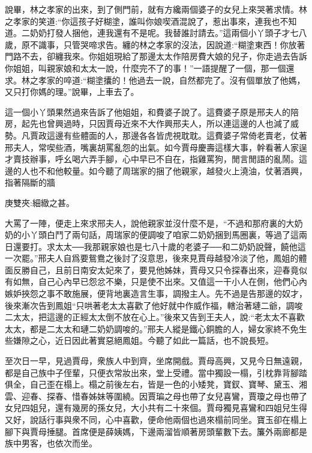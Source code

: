 \begin{parag}
    說畢，林之孝家的出來，到了側門前，就有方纔兩個婆子的女兒上來哭著求情。林之孝家的笑道:“你這孩子好糊塗，誰叫你娘喫酒混說了，惹出事來，連我也不知道。二奶奶打發人捆他，連我還有不是呢。我替誰討請去。”這兩個小丫頭子才七八歲，原不識事，只管哭啼求告。纏的林之孝家的沒法，因說道:“糊塗東西！你放著門路不去，卻纏我來。你姐姐現給了那邊太太作陪房費大娘的兒子，你走過去告訴你姐姐，叫親家娘和太太一說，什麼完不了的事！”一語提醒了一個，那一個還求。林之孝家的啐道:“糊塗攮的！他過去一說，自然都完了。沒有個單放了他媽，又只打你媽的理。”說畢，上車去了。
\end{parag}


\begin{parag}
    這一個小丫頭果然過來告訴了他姐姐，和費婆子說了。這費婆子原是邢夫人的陪房，起先也曾興過時，只因賈母近來不大作興邢夫人，所以連這邊的人也減了威勢。凡賈政這邊有些體面的人，那邊各各皆虎視耽耽。這費婆子常倚老賣老，仗著邢夫人，常喫些酒，嘴裏胡罵亂怨的出氣。如今賈母慶壽這樣大事，幹看著人家逞才賣技辦事，呼幺喝六弄手腳，心中早已不自在，指雞罵狗，閒言閒語的亂鬧。這邊的人也不和他較量。如今聽了周瑞家的捆了他親家，越發火上澆油，仗著酒興，指著隔斷的牆\begin{note}庚雙夾:細緻之甚。\end{note}大罵了一陣，便走上來求邢夫人，說他親家並沒什麼不是，“不過和那府裏的大奶奶的小丫頭白鬥了兩句話，周瑞家的便調唆了咱家二奶奶捆到馬圈裏，等過了這兩日還要打。求太太──我那親家娘也是七八十歲的老婆子──和二奶奶說聲，饒他這一次罷。”邢夫人自爲要鴛鴦之後討了沒意思，後來見賈母越發冷淡了他，鳳姐的體面反勝自己，且前日南安太妃來了，要見他姊妹，賈母又只令探春出來，迎春竟似有如無，自己心內早已怨忿不樂，只是使不出來。又值這一干小人在側，他們心內嫉妒挾怨之事不敢施展，便背地裏造言生事，調撥主人。先不過是告那邊的奴才，後來漸次告到鳳姐“只哄著老太太喜歡了他好就中作威作福，轄治著璉二爺，調唆二太太，把這邊的正經太太倒不放在心上。”後來又告到王夫人，說:“老太太不喜歡太太，都是二太太和璉二奶奶調唆的。”邢夫人縱是鐵心銅膽的人，婦女家終不免生些嫌隙之心，近日因此著實惡絕鳳姐。今聽了如此一篇話，也不說長短。
\end{parag}


\begin{parag}
    至次日一早，見過賈母，衆族人中到齊，坐席開戲。賈母高興，又見今日無遠親，都是自己族中子侄輩，只便衣常妝出來，堂上受禮。當中獨設一榻，引枕靠背腳踏俱全，自己歪在榻上。榻之前後左右，皆是一色的小矮凳，寶釵、寶琴、黛玉、湘雲、迎春、探春、惜春姊妹等圍繞。因賈㻞之母也帶了女兒喜鸞，賈瓊之母也帶了女兒四姐兒，還有幾房的孫女兒，大小共有二十來個。賈母獨見喜鸞和四姐兒生得又好，說話行事與衆不同，心中喜歡，便命他兩個也過來榻前同坐。寶玉卻在榻上腳下與賈母捶腿。首席便是薛姨媽，下邊兩溜皆順著房頭輩數下去。簾外兩廊都是族中男客，也依次而坐。
\end{parag}


